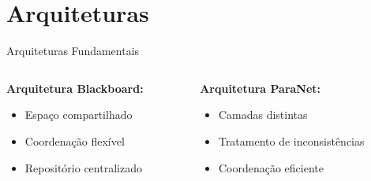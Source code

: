 \documentclass[aspectratio=169,xcolor=table]{beamer}
\begin{document}
\section{Arquiteturas}
\begin{frame}{Arquiteturas Fundamentais}
    \vspace{0.5em}
    \begin{columns}[T]
        \begin{column}{0.38\textwidth}
            \textbf{Arquitetura Blackboard:}
            \vspace{0.5em}
            \begin{itemize}\setlength{\itemsep}{0.5em}
                \item Espaço compartilhado
                \item Coordenação flexível
                \item Repositório centralizado
            \end{itemize}
        \end{column}
        \hfill
        \begin{column}{0.38\textwidth}
            \textbf{Arquitetura ParaNet:}
            \vspace{0.5em}
            \begin{itemize}\setlength{\itemsep}{0.5em}
                \item Camadas distintas
                \item Tratamento de inconsistências
                \item Coordenação eficiente
            \end{itemize}
        \end{column}
    \end{columns}
\end{frame}

\end{document}
